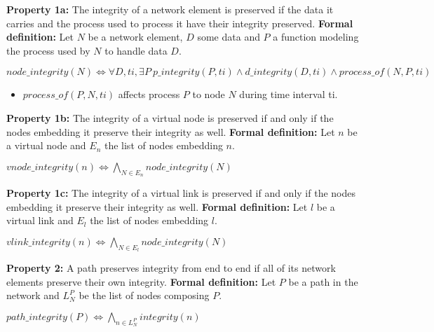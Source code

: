 \textbf{Property 1a:} The integrity of a network element is preserved if the data it carries and the process used to process it have their integrity preserved. 
\newline
\textbf{Formal definition:} Let $N$ be a network element, $D$ some data and $P$ a function modeling the process used by $N$ to handle data $D$.

\begin{myformula}
$node\_integrity(N) \Leftrightarrow \forall D,ti,\exists P~p\_integrity(P,ti) \wedge d\_integrity(D,ti) \wedge process\_of(N,P,ti)$
\end{myformula}

\begin{itemize}
\item $process\_of(P,N,ti)$ affects process $P$ to node $N$ during time interval ti.
\end{itemize}

\textbf{Property 1b:} The integrity of a virtual node is preserved if and only if the nodes embedding it preserve their integrity as well.
\newline
\textbf{Formal definition:} Let $n$ be a virtual node and $E_n$ the list of nodes embedding $n$.

\begin{myformula}
$vnode\_integrity(n) \Leftrightarrow \bigwedge\limits_{N \in E_n} node\_integrity(N)$
\end{myformula}

\textbf{Property 1c:} The integrity of a virtual link is preserved if and only if the nodes embedding it preserve their integrity as well.
\newline
\textbf{Formal definition:} Let $l$ be a virtual link and $E_l$ the list of nodes embedding $l$.

\begin{myformula}
$vlink\_integrity(n) \Leftrightarrow \bigwedge\limits_{N \in E_l} node\_integrity(N)$
\end{myformula}


\textbf{Property 2:} A path preserves integrity from end to end if all of its network elements preserve their own integrity.
\newline \textbf{Formal definition:} Let $P$ be a path in the network and $L^P_N$ be the list of nodes composing $P$.
\newline

\begin{myformula}
$path\_integrity(P) \Leftrightarrow \bigwedge\limits_{n \in L_N^P}integrity(n) $
\end{myformula}

